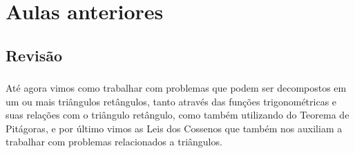 \documentclass[handout]{beamer}
\begin{document}

\section{Aulas anteriores}
\subsection{Revisão}
\begin{frame}[fragile]\frametitle{\subsecname}
    Até agora vimos como trabalhar com problemas que podem ser decompostos em um 
    ou mais triângulos retângulos, tanto através das funções trigonométricas e 
    suas relações com o triângulo retângulo, como também utilizando do Teorema 
    de Pitágoras, e por último vimos as Leis dos Cossenos que também nos auxiliam
    a trabalhar com problemas relacionados a triângulos.
\end{frame}

\end{document}
